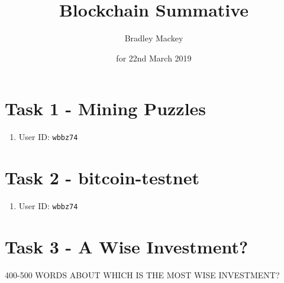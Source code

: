 \documentclass[11pt]{article}
\begin{document}
\title{\textbf{Blockchain Summative}}
\date{for 22nd March 2019}
\author{Bradley Mackey}
\maketitle


\section*{Task 1 - Mining Puzzles}

\begin{enumerate}
\item User ID: \texttt{wbbz74}
\end{enumerate}

\section*{Task 2 - bitcoin-testnet}

\begin{enumerate}
\item User ID: \texttt{wbbz74}
\end{enumerate}

\section*{Task 3 - A Wise Investment?}


400-500 WORDS ABOUT WHICH IS THE MOST WISE INVESTMENT?
\end{document}
